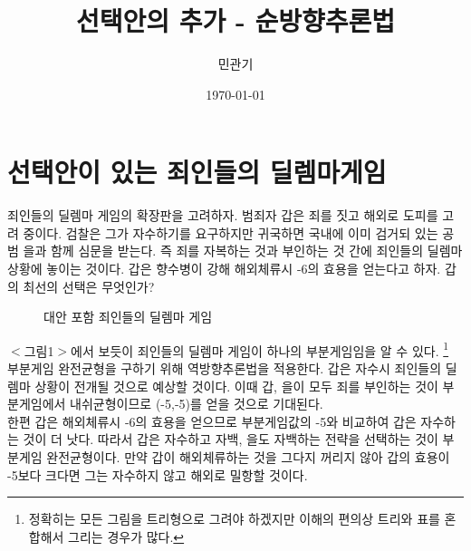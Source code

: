 \documentclass{oblivoir}
\title{선택안의 추가 - 순방향추론법}
\author{민관기}
\date{\today}
\begin{document}
\maketitle

\section{선택안이 있는 죄인들의 딜렘마게임}

죄인들의 딜렘마 게임의 확장판을 고려하자.
범죄자 갑은 죄를 짓고 해외로 도피를 고려 중이다. 검찰은 그가 자수하기를 요구하지만 귀국하면 국내에 이미 검거되 있는 공범 을과 함께 심문을 받는다. 즉 죄를 자복하는 것과 부인하는 것 간에 죄인들의 딜렘마 상황에 놓이는 것이다. 갑은 향수병이 강해 해외체류시 -6의 효용을 얻는다고 하자. 갑의 최선의 선택은 무엇인가? \\

\begin{figure}[!ht]
\begin{center}
\end{center}
\caption{대안 포함 죄인들의 딜렘마 게임}
\end{figure}


$<$그림1$>$에서 보듯이 죄인들의 딜렘마 게임이 하나의 부분게임임을 알 수 있다. \footnote{정확히는 모든 그림을 트리형으로 그려야 하겠지만 이해의 편의상 트리와 표를 혼합해서 그리는 경우가 많다.} 부분게임 완전균형을 구하기 위해 역방향추론법을 적용한다. 갑은 자수시 죄인들의 딜렘마 상황이 전개될 것으로 예상할 것이다. 이때 갑, 을이 모두 죄를 부인하는 것이 부분게임에서 내쉬균형이므로 (-5,-5)를 얻을 것으로 기대된다. \\
한편 갑은 해외체류시 -6의 효용을 얻으므로 부분게임값의 -5와 비교하여 갑은 자수하는 것이 더 낫다. 따라서 갑은 자수하고 자백, 을도 자백하는 전략을 선택하는 것이 부분게임 완전균형이다. 만약 갑이 해외체류하는 것을 그다지 꺼리지 않아 갑의 효용이 -5보다 크다면 그는 자수하지 않고 해외로 밀항할 것이다.\\
\end{document}
